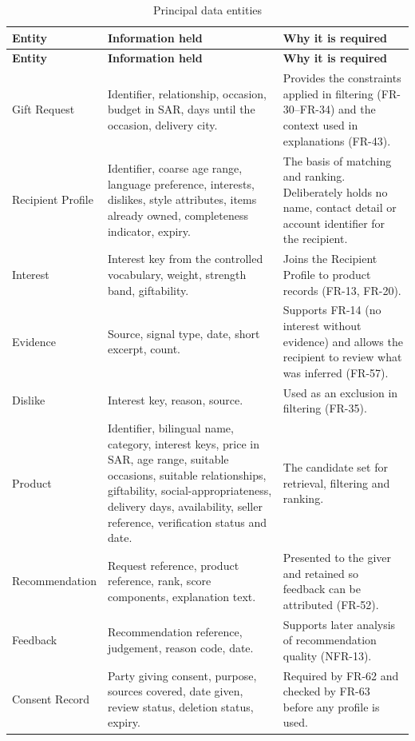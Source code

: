 \documentclass[11pt,a4paper]{report}
\begin{document}
\begin{longtable}{@{}L{3.1cm}L{5.6cm}L{5.9cm}@{}}
\caption{Principal data entities}\label{tab:entities}\\
\toprule
\textbf{Entity} & \textbf{Information held} & \textbf{Why it is required} \\ \midrule
\endfirsthead
\toprule \textbf{Entity} & \textbf{Information held} & \textbf{Why it is required} \\ \midrule
\endhead
\bottomrule
\endfoot
Gift Request & Identifier, relationship, occasion, budget in SAR, days until the occasion, delivery city. & Provides the constraints applied in filtering (FR-30--FR-34) and the context used in explanations (FR-43). \\
Recipient Profile & Identifier, coarse age range, language preference, interests, dislikes, style attributes, items already owned, completeness indicator, expiry. & The basis of matching and ranking. Deliberately holds no name, contact detail or account identifier for the recipient. \\
Interest & Interest key from the controlled vocabulary, weight, strength band, giftability. & Joins the Recipient Profile to product records (FR-13, FR-20). \\
Evidence & Source, signal type, date, short excerpt, count. & Supports FR-14 (no interest without evidence) and allows the recipient to review what was inferred (FR-57). \\
Dislike & Interest key, reason, source. & Used as an exclusion in filtering (FR-35). \\
Product & Identifier, bilingual name, category, interest keys, price in SAR, age range, suitable occasions, suitable relationships, giftability, social-appropriateness, delivery days, availability, seller reference, verification status and date. & The candidate set for retrieval, filtering and ranking. \\
Recommendation & Request reference, product reference, rank, score components, explanation text. & Presented to the giver and retained so feedback can be attributed (FR-52). \\
Feedback & Recommendation reference, judgement, reason code, date. & Supports later analysis of recommendation quality (NFR-13). \\
Consent Record & Party giving consent, purpose, sources covered, date given, review status, deletion status, expiry. & Required by FR-62 and checked by FR-63 before any profile is used. \\
\end{longtable}
\end{document}

